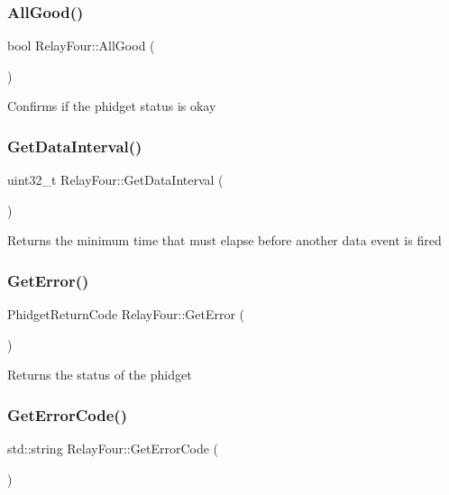 \subsubsection{\texorpdfstring{All\+Good()}{AllGood()}}
{\footnotesize\ttfamily bool Relay\+Four\+::\+All\+Good (\begin{DoxyParamCaption}{ }\end{DoxyParamCaption})\hspace{0.3cm}{\ttfamily [inline]}}

Confirms if the phidget status is okay\mbox{\label{classRelayFour_aaded0e5c95a240ce8f4f2a8e41f51de6}} 
\subsubsection{\texorpdfstring{Get\+Data\+Interval()}{GetDataInterval()}}
{\footnotesize\ttfamily uint32\+\_\+t Relay\+Four\+::\+Get\+Data\+Interval (\begin{DoxyParamCaption}{ }\end{DoxyParamCaption})\hspace{0.3cm}{\ttfamily [inline]}}

Returns the minimum time that must elapse before another data event is fired\mbox{\label{classRelayFour_a36f0d20421a3c390644344aed6951f2a}} 
\subsubsection{\texorpdfstring{Get\+Error()}{GetError()}}
{\footnotesize\ttfamily Phidget\+Return\+Code Relay\+Four\+::\+Get\+Error (\begin{DoxyParamCaption}{ }\end{DoxyParamCaption})\hspace{0.3cm}{\ttfamily [inline]}}

Returns the status of the phidget\mbox{\label{classRelayFour_aa22c7288d95a6d475c176d18b2659a04}} 
\subsubsection{\texorpdfstring{Get\+Error\+Code()}{GetErrorCode()}}
{\footnotesize\ttfamily std\+::string Relay\+Four\+::\+Get\+Error\+Code (\begin{DoxyParamCaption}{ }\end{DoxyParamCaption})\hspace{0.3cm}{\ttfamily [inline]}}

